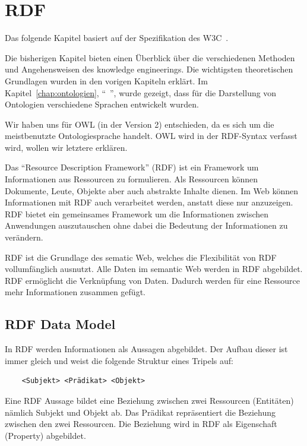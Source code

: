 \chapter{RDF}
\label{chap:rdf}
Das folgende Kapitel basiert auf der Spezifikation des W3C~\cite{w3rdf}.

Die bisherigen Kapitel bieten einen Überblick über die verschiedenen Methoden und Angehensweisen des knowledge engineerings. Die wichtigsten theoretischen Grundlagen wurden in den vorigen Kapiteln erklärt. Im Kapitel~\ref{chap:ontologien}, ``~'', wurde gezeigt, dass für die Darstellung von Ontologien verschiedene Sprachen entwickelt wurden. 

Wir haben uns für OWL (in der Version 2) entschieden, da es sich um die meistbenutzte Ontologiesprache handelt. OWL wird in der RDF-Syntax verfasst wird, wollen wir letztere erklären.

Das ``Resource Description Framework'' (RDF) ist ein Framework um Informationen aus Ressourcen zu formulieren. Als Ressourcen können Dokumente, Leute, Objekte aber auch abstrakte Inhalte dienen. Im Web können Informationen mit RDF auch verarbeitet werden, anstatt diese nur anzuzeigen. RDF bietet ein gemeinsames Framework um die Informationen zwischen Anwendungen auszutauschen ohne dabei die Bedeutung der Informationen zu verändern.

RDF ist die Grundlage des sematic Web, welches die Flexibilität von RDF vollumfänglich ausnutzt. Alle Daten im semantic Web werden in RDF abgebildet. RDF ermöglicht die Verknüpfung von Daten. Dadurch werden für eine Ressource mehr Informationen zusammen gefügt.\cite{cambSemRDF}

\section{RDF Data Model}
\label{sec:rdf_rdf_dataModel}
In RDF werden Informationen als Aussagen abgebildet. Der Aufbau dieser ist immer gleich und weist die folgende Struktur eines Tripels auf:

\begin{lstlisting}
    <Subjekt> <Prädikat> <Objekt>
\end{lstlisting}

Eine RDF Aussage bildet eine Beziehung zwischen zwei Ressourcen (Entitäten) nämlich Subjekt und Objekt ab. Das Prädikat repräsentiert die Beziehung zwischen den zwei Ressourcen. Die Beziehung wird in RDF als Eigenschaft (Property) abgebildet.

